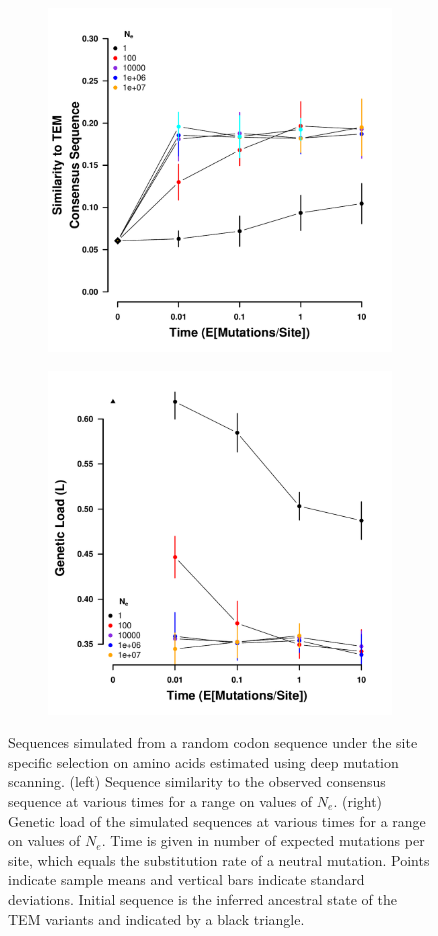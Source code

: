 \documentclass[12pt]{article}
\begin{document}
\begin{figure}[h]
    \centering
    \begin{subfigure}
        \centering
        \includegraphics[width=.45\textwidth]{img/simulated_dist_time_DMS_random.pdf}
    \end{subfigure}
    \begin{subfigure}
        \centering
        \includegraphics[width=.45\textwidth]{img/simulated_gl_time_DMS_random.pdf}
    \end{subfigure}
    \caption{Sequences simulated from a random codon sequence under the site specific selection on amino acids estimated using deep mutation scanning. 
    (left) Sequence similarity to the observed consensus sequence at various times for a range on values of $N_e$.
    (right) Genetic load of the simulated sequences at various times for a range on values of $N_e$.
    Time is given in number of expected mutations per site, which equals the substitution rate of a neutral mutation.
    Points indicate sample means and vertical bars indicate standard deviations. Initial sequence is the inferred ancestral state of the TEM variants and indicated by a black triangle.}
    \label{fig:dms_sim_rand}
\end{figure}
\end{document}
